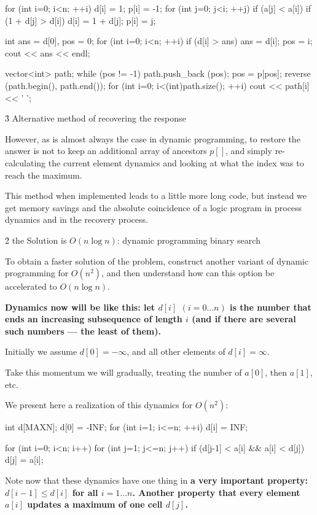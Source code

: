 for (int i=0; i<n; ++i) {
d[i] = 1;
p[i] = -1;
for (int j=0; j<i; ++j)
if (a[j] < a[i])
if (1 + d[j] > d[i]) {
d[i] = 1 + d[j];
p[i] = j;
}
}

int ans = d[0], pos = 0;
for (int i=0; i<n; ++i)
if (d[i] > ans) {
ans = d[i];
pos = i;
}
cout << ans << endl;

vector<int> path;
while (pos != -1) {
path.push_back (pos);
pos = p[pos];
}
reverse (path.begin(), path.end());
for (int i=0; i<(int)path.size(); ++i)
cout << path[i] << ' ';
\endcode


\h3{ Alternative method of recovering the response }

However, as is almost always the case in dynamic programming, to restore the answer is not to keep an additional array of ancestors $p[]$, and simply re-calculating the current element dynamics and looking at what the index was to reach the maximum.

This method when implemented leads to a little more long code, but instead we get memory savings and the absolute coincidence of a logic program in process dynamics and in the recovery process.



\h2{ the Solution is $O (n \log n)$: dynamic programming binary search }

To obtain a faster solution of the problem, construct another variant of dynamic programming for $O (n^2)$, and then understand how can this option be accelerated to $O (n \log n)$.

\bf{Dynamics} now will be like this: let $d[i]$ $(i = 0 \ldots n)$ is the number that ends an increasing subsequence of length $i$ (and if there are several such numbers --- the least of them).

Initially we assume $d[0] = -\infty$, and all other elements of $d[i] = \infty$.

Take this momentum we will gradually, treating the number of $a[0]$, then $a[1]$, etc.

We present here a realization of this dynamics for $O (n^2)$:

\code
int d[MAXN];
d[0] = -INF;
for (int i=1; i<=n; ++i)
d[i] = INF;

for (int i=0; i<n; i++)
for (int j=1; j<=n; j++)
if (d[j-1] < a[i] && a[i] < d[j])
d[j] = a[i];
\endcode

Note now that these dynamics have one thing in \bf{a very important property}: $d[i-1] \le d[i]$ for all $i = 1 \ldots n$. Another property that every element $a[i]$ updates a maximum of one cell $d[j]$.


